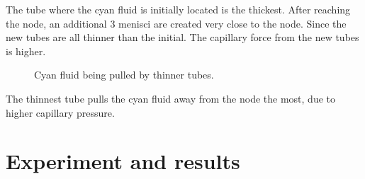 \documentclass{crm-article}
\begin{document}
			
			The tube where the cyan fluid is initially located is the thickest. After reaching the node, an additional 3 menisci are created very close to the node. Since the new tubes are all thinner than the initial. The capillary force from the new tubes is higher.
			
			\begin{figure}[H]
				\centering
				\hfill
				\caption{Cyan fluid being pulled by thinner tubes.}
			\end{figure}
			
			The thinnest tube pulls the cyan fluid away from the node the most, due to higher capillary pressure.	

	\section{Experiment and results} \label{sec:experiment}
\end{document}

